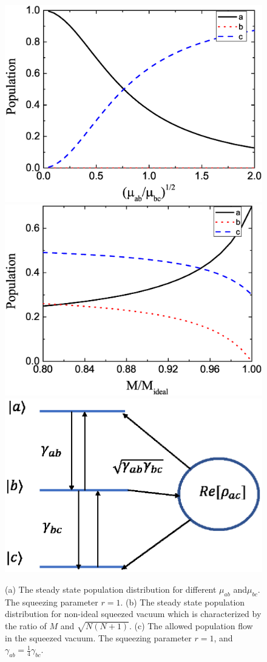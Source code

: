 \documentclass[aps,showpacs,twocolumn,twoside,groupedaddress]{revtex4}
\begin{document}
\begin{figure}
\includegraphics[width=1\columnwidth]{atom_fig4.eps}
\includegraphics[width=1\columnwidth]{atom_fig5.eps}
\includegraphics[width=1\columnwidth]{atom_fig3.eps}
\caption{(a) The steady state population distribution for different $\mu_{ab}$ and$\mu_{bc}$. The squeezing parameter $r=1$. (b) The steady state population distribution for non-ideal squeezed vacuum which is characterized by the ratio of $M$ and $\sqrt{N(N+1)}$. (c) The allowed population flow in the squeezed vacuum. The squeezing parameter $r=1$, and $\gamma_{ab}=\frac{1}{4}\gamma_{bc}$.}
\label{2}
\end{figure}
\end{document}
